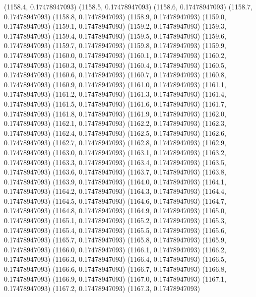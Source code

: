 {					(1158.4, 0.17478947093)
					(1158.5, 0.17478947093)
					(1158.6, 0.17478947093)
					(1158.7, 0.17478947093)
					(1158.8, 0.17478947093)
					(1158.9, 0.17478947093)
					(1159.0, 0.17478947093)
					(1159.1, 0.17478947093)
					(1159.2, 0.17478947093)
					(1159.3, 0.17478947093)
					(1159.4, 0.17478947093)
					(1159.5, 0.17478947093)
					(1159.6, 0.17478947093)
					(1159.7, 0.17478947093)
					(1159.8, 0.17478947093)
					(1159.9, 0.17478947093)
					(1160.0, 0.17478947093)
					(1160.1, 0.17478947093)
					(1160.2, 0.17478947093)
					(1160.3, 0.17478947093)
					(1160.4, 0.17478947093)
					(1160.5, 0.17478947093)
					(1160.6, 0.17478947093)
					(1160.7, 0.17478947093)
					(1160.8, 0.17478947093)
					(1160.9, 0.17478947093)
					(1161.0, 0.17478947093)
					(1161.1, 0.17478947093)
					(1161.2, 0.17478947093)
					(1161.3, 0.17478947093)
					(1161.4, 0.17478947093)
					(1161.5, 0.17478947093)
					(1161.6, 0.17478947093)
					(1161.7, 0.17478947093)
					(1161.8, 0.17478947093)
					(1161.9, 0.17478947093)
					(1162.0, 0.17478947093)
					(1162.1, 0.17478947093)
					(1162.2, 0.17478947093)
					(1162.3, 0.17478947093)
					(1162.4, 0.17478947093)
					(1162.5, 0.17478947093)
					(1162.6, 0.17478947093)
					(1162.7, 0.17478947093)
					(1162.8, 0.17478947093)
					(1162.9, 0.17478947093)
					(1163.0, 0.17478947093)
					(1163.1, 0.17478947093)
					(1163.2, 0.17478947093)
					(1163.3, 0.17478947093)
					(1163.4, 0.17478947093)
					(1163.5, 0.17478947093)
					(1163.6, 0.17478947093)
					(1163.7, 0.17478947093)
					(1163.8, 0.17478947093)
					(1163.9, 0.17478947093)
					(1164.0, 0.17478947093)
					(1164.1, 0.17478947093)
					(1164.2, 0.17478947093)
					(1164.3, 0.17478947093)
					(1164.4, 0.17478947093)
					(1164.5, 0.17478947093)
					(1164.6, 0.17478947093)
					(1164.7, 0.17478947093)
					(1164.8, 0.17478947093)
					(1164.9, 0.17478947093)
					(1165.0, 0.17478947093)
					(1165.1, 0.17478947093)
					(1165.2, 0.17478947093)
					(1165.3, 0.17478947093)
					(1165.4, 0.17478947093)
					(1165.5, 0.17478947093)
					(1165.6, 0.17478947093)
					(1165.7, 0.17478947093)
					(1165.8, 0.17478947093)
					(1165.9, 0.17478947093)
					(1166.0, 0.17478947093)
					(1166.1, 0.17478947093)
					(1166.2, 0.17478947093)
					(1166.3, 0.17478947093)
					(1166.4, 0.17478947093)
					(1166.5, 0.17478947093)
					(1166.6, 0.17478947093)
					(1166.7, 0.17478947093)
					(1166.8, 0.17478947093)
					(1166.9, 0.17478947093)
					(1167.0, 0.17478947093)
					(1167.1, 0.17478947093)
					(1167.2, 0.17478947093)
					(1167.3, 0.17478947093)
}

